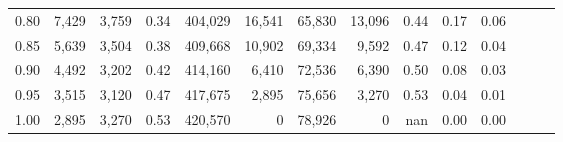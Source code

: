 \begin{tabular}{rrrrrrrrrrrrrr}
0.80 &   7,429 &  3,759 &  0.34 &  404,029 &   16,541 &  65,830 &  13,096 &  0.44 &  0.17 &      0.06 \\
0.85 &   5,639 &  3,504 &  0.38 &  409,668 &   10,902 &  69,334 &   9,592 &  0.47 &  0.12 &      0.04 \\
0.90 &   4,492 &  3,202 &  0.42 &  414,160 &    6,410 &  72,536 &   6,390 &  0.50 &  0.08 &      0.03 \\
0.95 &   3,515 &  3,120 &  0.47 &  417,675 &    2,895 &  75,656 &   3,270 &  0.53 &  0.04 &      0.01 \\
1.00 &   2,895 &  3,270 &  0.53 &  420,570 &        0 &  78,926 &       0 &   nan &  0.00 &      0.00 \\
\bottomrule
\end{tabular}
